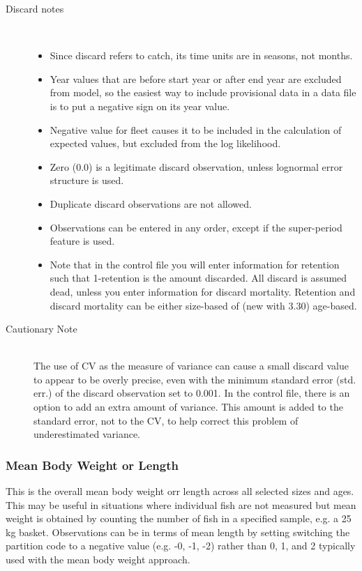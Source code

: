 \begin{description}
\begin{itemize}
	\end{itemize}
	\item[Discard notes]\
	\begin{itemize}
		\item Since discard refers to catch, its time units are in seasons, not months.
		\item Year values that are before start year or after end year are excluded from model, so the easiest way to include provisional data in a data file is to put a negative sign on its year value.
		\item Negative value for fleet causes it to be included in the calculation of expected values, but excluded from the log likelihood.
		\item Zero (0.0) is a legitimate discard observation, unless lognormal error structure is used.
		\item Duplicate discard observations are not allowed.
		\item Observations can be entered in any order, except if the super-period feature is used. 
		\item Note that in the control file you will enter information for retention such that 1-retention is the amount discarded.  All discard is assumed dead, unless you enter information for discard mortality.  Retention and discard mortality can be either size-based of (new with 3.30) age-based.
	\end{itemize}
	\item[Cautionary Note]\hfill\\
	The use of CV as the measure of variance can cause a small discard value to appear to be overly precise, even with the minimum standard error (std. err.) of the discard observation set to 0.001.  In the control file, there is an option to add an extra amount of variance.  This amount is added to the standard error, not to the CV, to help correct this problem of underestimated variance.
\end{description}

\subsubsection{Mean Body Weight or Length}
This is the overall mean body weight orr length across all selected sizes and ages.  This may be useful in situations where individual fish are not measured but mean weight is obtained by counting the number of fish in a specified sample, e.g. a 25 kg basket.  Observations can be  in terms of mean length by setting switching the partition code to a negative value (e.g. -0, -1, -2) rather than 0, 1, and 2 typically used with the mean body weight approach.


